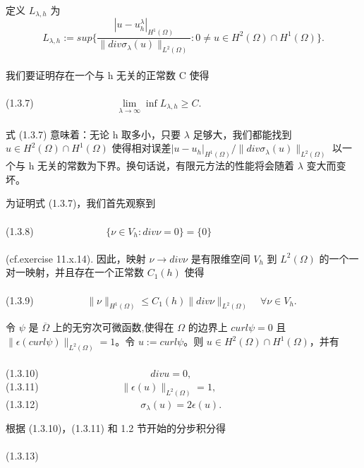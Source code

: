 \documentclass[a4paper,UTF8,titlepage]{ctexart}
\begin{document}
	定义 $L_{\lambda,h}$ 为
	$$
	L_{\lambda,h} := sup \{ \frac{|u-u_h^{\lambda}|_{H^1(\Omega)}}{\| div \sigma_{\lambda}(u) \|_{L^2(\Omega)}} : 0 \ne u \in H^2(\Omega) \cap H^1(\Omega) \}.
	$$
	\\ 
	我们要证明存在一个与 h 无关的正常数 C 使得
	\\ \\
	(1.3.7)
	$
	\quad \quad \quad \quad \quad \quad \quad \quad
	\lim\limits_{\lambda \to \infty} \inf L_{\lambda,h} \ge C.
	$
	\\ \\
	式 (1.3.7) 意味着：无论 h 取多小，只要 $\lambda$ 足够大，我们都能找到 $u \in H^2(\Omega) \cap H^1(\Omega)$ 使得相对误差$ |u-u_h|_{H^1(\Omega)} / \| div \sigma_{\lambda}(u) \|_{L^2(\Omega)} $ 以一个与 h 无关的常数为下界。换句话说，有限元方法的性能将会随着 $\lambda$ 变大而变坏。
	\par
	为证明式 (1.3.7)，我们首先观察到
	\\ \\
	(1.3.8)
	$
	\quad \quad \quad \quad \quad \quad \quad
	\{ \nu \in V_h : div \nu = 0 \} = \{ 0 \}
	$
	\\ \\
	(cf.exercise 11.x.14). 因此，映射 $\nu \to div \nu$ 是有限维空间 $V_h$ 到 $L^2(\Omega)$ 的一个一对一映射，并且存在一个正常数 $C_1(h)$ 使得
	\\ \\
	(1.3.9)
	$
	\quad \quad \quad \quad \quad
	\| \nu \|_{H^1(\Omega)} \le C_1(h) \| div \nu \|_{L^2(\Omega)} \quad \forall \nu \in V_h.
	$
	\\ \par 
	令 $\psi$ 是 $\overline{\Omega}$ 上的无穷次可微函数,使得在 $\Omega$ 的边界上 $curl \psi = 0$ 且 $\| \epsilon(curl \psi) \|_{L^2(\Omega)} = 1$。令 $u := curl \psi$。则 $u \in H^2(\Omega) \cap H^1(\Omega)$，并有
	\\ \\
	(1.3.10)
	$
	\quad \quad \quad \quad \quad \quad \quad \quad \quad \quad \quad
	div u = 0,
	$
	\\
	(1.3.11)
	$
	\quad \quad \quad \quad \quad \quad \quad \quad
	\| \epsilon(u) \|_{L^2(\Omega)} = 1,
	$
	\\
	(1.3.12)
	$
	\quad \quad \quad \quad \quad \quad \quad \quad \quad \quad 
	\sigma_{\lambda}(u) = 2 \epsilon(u).
	$
	\\ \par 
	根据 (1.3.10)，(1.3.11) 和 1.2 节开始的分步积分得
	\\ \\
	(1.3.13)
\end{document}
